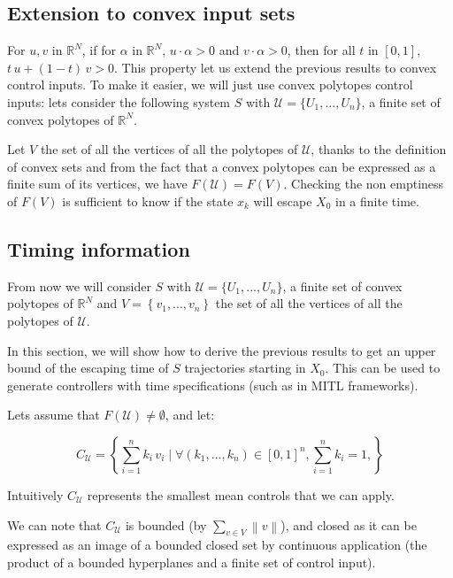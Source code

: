 \documentclass[12pt]{article}
\begin{document}
\subsection*{Extension to convex input sets}

For $u,v$ in $\mathbb{R}^N$, if for $\alpha$ in $\mathbb{R}^N$, $u \cdot \alpha > 0$ and $v \cdot \alpha > 0$, then for all $t$ in $[0,1]$, $t \, u + (1-t) \, v > 0$.
This property let us extend the previous results to convex control inputs.
To make it easier, we will just use convex polytopes control inputs:
lets consider the following system $S$ with $\mathcal{U} = \{U_1,...,U_n\}$, a finite set of convex polytopes of $\mathbb{R}^N$.


Let $V$ the set of all the vertices of all the polytopes of $\mathcal{U}$, thanks to the definition of convex sets and from the fact that a convex polytopes can be expressed as a finite sum of its vertices, we have $F(\mathcal{U}) = F(V)$.
Checking the non emptiness of $F(V)$ is sufficient to know if the state $x_k$ will escape $X_0$ in a finite time.

\subsection*{Timing  information}
From now we will consider $S$ with $\mathcal{U} = \{U_1,...,U_n\}$, a finite set of convex polytopes of $\mathbb{R}^N$ and $V = \left \{v_1,...,v_n \right \}$ the set of all the vertices of all the polytopes of $\mathcal{U}$.

In this section, we will show how to derive the previous results to get an upper bound of the escaping time of $S$ trajectories starting in $X_0$.
This can be used to generate controllers with time specifications (such as in MITL frameworks).

Lets assume that $F(\mathcal{U}) \neq \emptyset$, and let:

\begin{equation}
C_\mathcal{U}=
\left \{
\sum_{i=1}^n k_i \, v_i
\mid 
\forall (k_1,...,k_n) \in [0,1]^n,
\sum_{i=1}^n k_i = 1,
\right \}
\end{equation}

Intuitively $C_\mathcal{U}$ represents the smallest mean controls that we can apply.


We can note that $C_\mathcal{U}$ is bounded (by $\sum_{v \in V} \left \| v \right \|$), and closed as it can be expressed as an image of a bounded closed set by continuous application (the product of a bounded hyperplanes and a finite set of control input).
\end{document}
